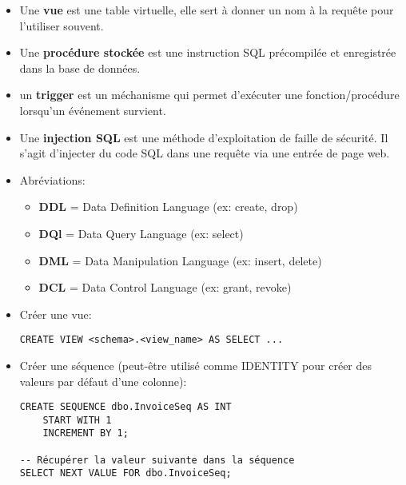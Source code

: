\documentclass[a4paper]{article}
\begin{document}
\begin{itemize}



\item Une \textbf{vue} est une table virtuelle, elle sert à donner un nom à la requête pour l'utiliser souvent.



\item Une \textbf{procédure stockée} est une instruction SQL précompilée et enregistrée dans la base de données.



\item un \textbf{trigger} est un méchanisme qui permet d'exécuter une fonction/procédure lorsqu'un événement survient.



\item Une \textbf{injection SQL} est une méthode d'exploitation de faille de sécurité. Il s'agit d'injecter du code SQL dans une requête via une entrée de page web.



\item Abréviations:
\begin{itemize}
    \item \textbf{DDL} = Data Definition Language (ex: create, drop)
    \item \textbf{DQl} = Data Query Language (ex: select)
    \item \textbf{DML} = Data Manipulation Language (ex: insert, delete)
    \item \textbf{DCL} = Data Control Language (ex: grant, revoke)
\end{itemize}



\item Créer une vue:
\begin{verbatim}
CREATE VIEW <schema>.<view_name> AS SELECT ...
\end{verbatim}



\item Créer une séquence (peut-être utilisé comme IDENTITY pour créer des valeurs par défaut d'une colonne):
\begin{verbatim}
CREATE SEQUENCE dbo.InvoiceSeq AS INT
    START WITH 1
    INCREMENT BY 1;

-- Récupérer la valeur suivante dans la séquence
SELECT NEXT VALUE FOR dbo.InvoiceSeq;
\end{verbatim}



\end{itemize}
\end{document}
